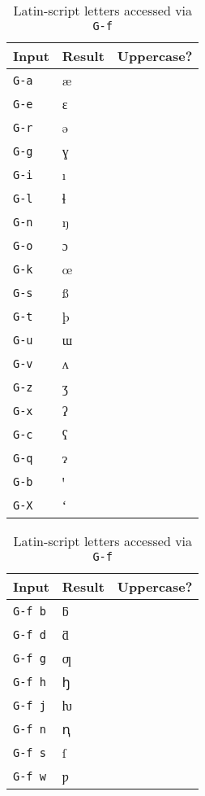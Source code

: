 \documentclass[oneside]{memoir}
\newcommand{\cmark}{\ding{51}}
\newcommand{\xmark}{\ding{55}}
\newcommand{\key}{\verb}
\begin{document}
{{{\begin{table}
\centering
\begin{minipage}{0.3\linewidth}
\centering
\caption{Latin-script letters accessed via a single key}
\label{tab:single_key}
\begin{tabular}{lll}
\toprule
Input & Result & Uppercase? \\
\midrule
\key|G-a| & æ & \cmark \\
\key|G-e| & ɛ & \cmark \\
\key|G-r| & ə & \cmark \\
\key|G-g| & ɣ & \cmark \\
\key|G-i| & ı & \xmark \\
\key|G-l| & ɬ & \cmark \\
\key|G-n| & ŋ & \cmark \\
\key|G-o| & ɔ & \cmark \\
\key|G-k| & œ & \cmark \\
\key|G-s| & ß & \cmark \\
\key|G-t| & þ & \cmark \\
\key|G-u| & ɯ & \cmark \\
\key|G-v| & ʌ & \cmark \\
\key|G-z| & ʒ & \cmark \\
\key|G-x| & ʔ & \xmark \\
\key|G-c| & ʕ & \xmark \\
\key|G-q| & ɂ & \cmark \\
\key|G-b| & ꞌ & \cmark \\
\key|G-X| & ʻ & \xmark \\
\bottomrule
\end{tabular}
\end{minipage}\hfill
\begin{minipage}{0.3\linewidth}
\centering
\cprotect\caption{Latin-script letters accessed via \key|G-f|}
\label{tab:letters_g-f}
\begin{tabular}{lll}
\toprule
Input & Result & Uppercase? \\
\midrule
\key|G-f b| & ƃ & \cmark \\
\key|G-f d| & ƌ & \cmark \\
\key|G-f g| & ƣ & \cmark \\
\key|G-f h| & ꜧ & \cmark \\
\key|G-f j| & ƕ & \cmark \\
\key|G-f n| & ꞑ & \cmark \\
\key|G-f s| & ſ & \xmark \\
\key|G-f w| & ƿ & \cmark \\

\end{tabular}
\end{minipage}
\end{table}}}}
\end{document}
